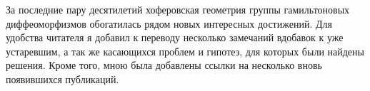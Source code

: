 За последние пару десятилетий хоферовская геометрия группы
гамильтоновых диффеоморфизмов обогатилась рядом новых интересных
достижений.
Для удобства читателя я добавил к переводу несколько замечаний
вдобавок к уже устаревшим, а так же касающихся проблем и гипотез, для
которых были найдены решения. Кроме того, мною была добавлены ссылки на
несколько вновь появившихся публикаций.
